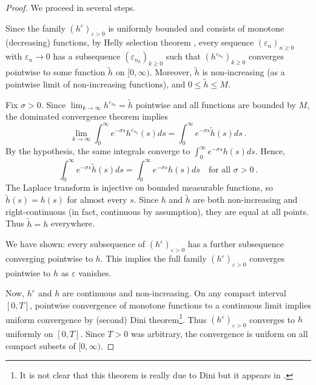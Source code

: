 \documentclass[reqno, 12pt, a4paper]{amsart}
\theoremstyle{plain}
\theoremstyle{definition}
\begin{document}
\begin{proof}
 
We proceed in several steps.

\bigskip

Since the family $(h^\varepsilon)_{\varepsilon>0}$ is uniformly bounded and consists of monotone (decreasing) functions, by Helly selection theorem \cite[Theorem 25.9]{B95}, every sequence $(\varepsilon_n)_{n \ge 0}$ with $\varepsilon_n \to 0$ has a subsequence $(\varepsilon_{n_k})_{k \ge 0}$ such that $(h^{\varepsilon_{n_k}})_{k\ge 0}$ converges pointwise to some function $\tilde{h}$ on $[0,\infty)$. Moreover, $\tilde{h}$ is non-increasing (as a pointwise limit of non-increasing functions), and $0 \le \tilde{h} \le M$.

\bigskip

Fix $\sigma > 0$. Since $\lim_{k \to \infty} h^{\varepsilon_{n_k}} = \tilde{h}$ pointwise and all functions are bounded by $M$, the dominated convergence theorem implies
\[
\lim_{k \to \infty} \int_0^\infty e^{-\sigma s} h^{\varepsilon_{n_k}}(s)  ds = \int_0^\infty e^{-\sigma s} \tilde{h}(s)  ds \ .
\]
By the hypothesis, the same integrals converge to $\int_0^\infty e^{-\sigma s} h(s)  ds$. Hence,
\[
\int_0^\infty e^{-\sigma s} \tilde{h}(s)  ds = \int_0^\infty e^{-\sigma s} h(s)  ds \quad \text{for all } \sigma > 0 \ .
\]
The Laplace transform is injective on bounded measurable functions, so $\tilde{h}(s) = h(s)$ for almost every $s$. Since $h$ and $\tilde{h}$ are both non-increasing and right-continuous (in fact, continuous by assumption), they are equal at all points. Thus $\tilde{h} = h$ everywhere.

\bigskip

We have shown: every subsequence of $(h^\varepsilon)_{\varepsilon >0}$ has a further subsequence converging pointwise to $h$. This implies the full family $(h^\varepsilon)_{\varepsilon>0}$ converges pointwise to $h$ as $\varepsilon$ vanishes.

\bigskip

Now, $h^\varepsilon$ and $h$ are continuous and non-increasing. On any compact interval $[0,T]$, pointwise convergence of monotone functions to a continuous limit implies uniform convergence by (second) Dini  theorem{\footnote{It is not clear that this theorem is really due to Dini  but it appears in \cite{PS98}.}}. Thus $(h^\varepsilon)_{\varepsilon>0}$ converges to $h$ uniformly on $[0,T]$. Since $T>0$ was arbitrary, the convergence is uniform on all compact subsets of $[0,\infty)$.




\end{proof}
\end{document}
